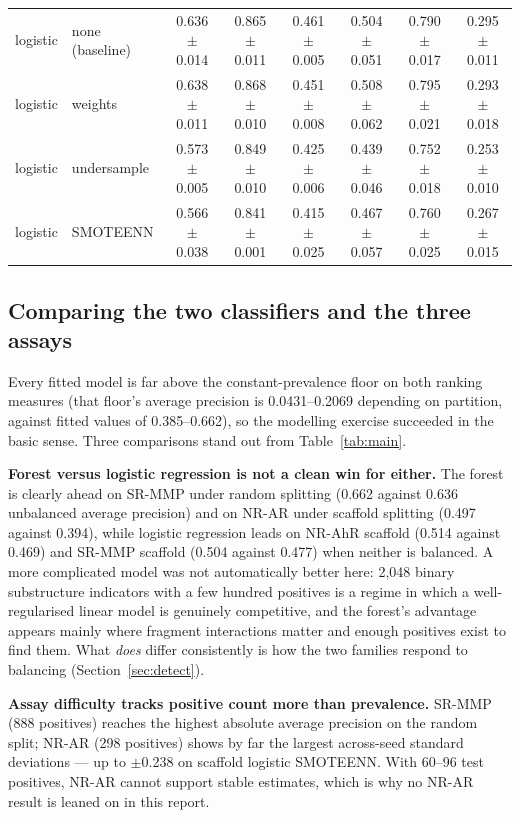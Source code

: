 \documentclass[10pt,letterpaper]{article}
\newcommand{\pmx}{$\pm$}
\begin{document}
\begin{table}[!htbp]
\begin{tabular}{@{}llccc|ccc@{}}
logistic & none (baseline) & 0.636 \pmx{} 0.014 & 0.865 \pmx{} 0.011 & 0.461 \pmx{} 0.005 & 0.504 \pmx{} 0.051 & 0.790 \pmx{} 0.017 & 0.295 \pmx{} 0.011 \\
logistic & weights         & 0.638 \pmx{} 0.011 & 0.868 \pmx{} 0.010 & 0.451 \pmx{} 0.008 & 0.508 \pmx{} 0.062 & 0.795 \pmx{} 0.021 & 0.293 \pmx{} 0.018 \\
logistic & undersample     & 0.573 \pmx{} 0.005 & 0.849 \pmx{} 0.010 & 0.425 \pmx{} 0.006 & 0.439 \pmx{} 0.046 & 0.752 \pmx{} 0.018 & 0.253 \pmx{} 0.010 \\
logistic & SMOTEENN        & 0.566 \pmx{} 0.038 & 0.841 \pmx{} 0.001 & 0.415 \pmx{} 0.025 & 0.467 \pmx{} 0.057 & 0.760 \pmx{} 0.025 & 0.267 \pmx{} 0.015 \\
\bottomrule
\end{tabular}
\end{table}

\subsection{Comparing the two classifiers and the three assays}

Every fitted model is far above the constant-prevalence floor on both ranking measures (that floor's
average precision is 0.0431--0.2069 depending on partition, against fitted values of 0.385--0.662),
so the modelling exercise succeeded in the basic sense. Three comparisons stand out from
Table~\ref{tab:main}.

\textbf{Forest versus logistic regression is not a clean win for either.} The forest is clearly ahead
on SR-MMP under random splitting (0.662 against 0.636 unbalanced average precision) and on NR-AR
under scaffold splitting (0.497 against 0.394), while logistic regression leads on NR-AhR scaffold
(0.514 against 0.469) and SR-MMP scaffold (0.504 against 0.477) when neither is balanced. A more
complicated model was not automatically better here: 2{,}048 binary substructure indicators with a
few hundred positives is a regime in which a well-regularised linear model is genuinely competitive,
and the forest's advantage appears mainly where fragment interactions matter and enough positives
exist to find them. What \emph{does} differ consistently is how the two families respond to
balancing (Section~\ref{sec:detect}).

\textbf{Assay difficulty tracks positive count more than prevalence.} SR-MMP (888 positives) reaches
the highest absolute average precision on the random split; NR-AR (298 positives) shows by far the
largest across-seed standard deviations --- up to \pmx{}0.238 on scaffold logistic SMOTEENN. With
60--96 test positives, NR-AR cannot support stable estimates, which is why no NR-AR result is leaned
on in this report.
\end{document}
